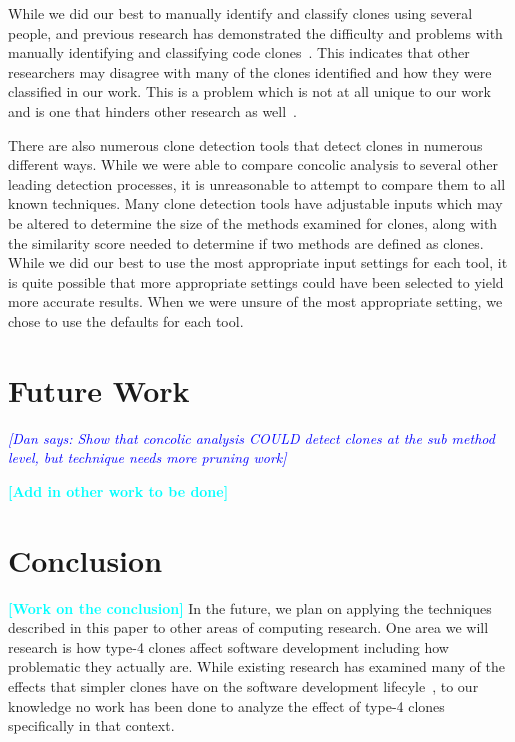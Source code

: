 \documentclass[smallextended]{svjour3}       %
\newcommand{\todo}[1]{\textcolor{cyan}{\textbf{[#1]}}}
\newcommand{\dan}[1]{\textcolor{blue}{{\it [Dan says: #1]}}}
\begin{document}
While we did our best to manually identify and classify clones using several people, and previous research has demonstrated the difficulty and problems with manually identifying and classifying code clones~\cite{Walenstein:2003:PCT:950792.951349}. This indicates that other researchers may disagree with many of the clones identified and how they were classified in our work. This is a problem which is not at all unique to our work and is one that hinders other research as well~\cite{Lavoie:2011:ATC:1985404.1985411}.

There are also numerous clone detection tools that detect clones in numerous different ways. While we were able to compare concolic analysis to several other leading detection processes, it is unreasonable to attempt to compare them to all known techniques. Many clone detection tools have adjustable inputs which may be altered to determine the size of the methods examined for clones, along with the similarity score needed to determine if two methods are defined as clones. While we did our best to use the most appropriate input settings for each tool, it is quite possible that more appropriate settings could have been selected to yield more accurate results. When we were unsure of the most appropriate setting, we chose to use the defaults for each tool.




\section{Future Work}



\dan{Show that concolic analysis COULD detect clones at the sub method level, but technique needs more pruning work}


\todo{Add in other work to be done}



\section{Conclusion}
\label{sec: conclusion}
\todo{Work on the conclusion}
In the future, we plan on applying the techniques described in this paper to other areas of computing research. One area we will research is how type-4 clones affect software development including how problematic they actually are. While existing research has examined many of the effects that simpler clones have on the software development lifecyle~\cite{Juergens:2009:CCM:1555001.1555062}, to our knowledge no work has been done to analyze the effect of type-4 clones specifically in that context.
\end{document}
